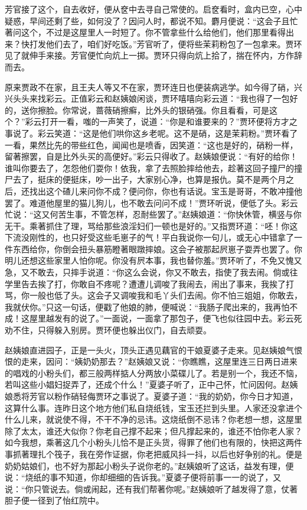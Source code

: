 \begin{parag}
    芳官接了这个，自去收好，便从奁中去寻自己常使的。启奁看时，盒内已空，心中疑惑，早间还剩了些，如何没了？因问人时，都说不知。麝月便说：“这会子且忙著问这个，不过是这屋里人一时短了。你不管拿些什么给他们，他们那里看得出来？快打发他们去了，咱们好吃饭。”芳官听了，便将些茉莉粉包了一包拿来。贾环见了就伸手来接。芳官便忙向炕上一掷。贾环只得向炕上拾了，揣在怀内，方作辞而去。
\end{parag}


\begin{parag}
    原来贾政不在家，且王夫人等又不在家，贾环连日也便装病逃学。如今得了硝，兴兴头头来找彩云。正值彩云和赵姨娘闲谈，贾环嘻嘻向彩云道：“我也得了一包好的，送你擦脸。你常说，蔷薇硝擦癣，比外头的银硝强。你且看看，可是这个？”彩云打开一看，嗤的一声笑了，说道：“你是和谁要来的？”贾环便将方才之事说了。彩云笑道：“这是他们哄你这乡老呢。这不是硝，这是茉莉粉。”贾环看了一看，果然比先的带些红色，闻闻也是喷香，因笑道：“这也是好的，硝粉一样，留著擦罢，自是比外头买的高便好。”彩云只得收了。赵姨娘便说：“有好的给你！谁叫你要去了，怎怨他们耍你！依我，拿了去照脸摔给他去，趁著这回子撞尸的撞尸去了，挺床的便挺床，吵一出子，大家别心净，也算是报仇。莫不是两个月之后，还找出这个碴儿来问你不成？便问你，你也有话说。宝玉是哥哥，不敢冲撞他罢了。难道他屋里的猫儿狗儿，也不敢去问问不成！”贾环听说，便低了头。彩云忙说：“这又何苦生事，不管怎样，忍耐些罢了。”赵姨娘道：“你快休管，横竖与你无干。乘著抓住了理，骂给那些浪淫妇们一顿也是好的。”又指贾环道：“呸！你这下流没刚性的，也只好受这些毛崽子的气！平白我说你一句儿，或无心中错拿了一件东西给你，你倒会扭头暴筋瞪著眼蹾摔娘。这会子被那起屄崽子耍弄也罢了。你明儿还想这些家里人怕你呢。你没有屄本事，我也替你羞。”贾环听了，不免又愧又急，又不敢去，只摔手说道：“你这么会说，你又不敢去，指使了我去闹。倘或往学里告去挨了打，你敢自不疼呢？遭遭儿调唆了我闹去，闹出了事来，我挨了打骂，你一般也低了头。这会子又调唆我和毛丫头们去闹。你不怕三姐姐，你敢去，我就伏你。”只这一句话，便戳了他娘的肺，便喊说：“我肠子爬出来的，我再怕不成！这屋里越发有的说了。”一面说，一面拿了那包子，便飞也似往园中去。彩云死劝不住，只得躲入别房。贾环便也躲出仪门，自去顽耍。
\end{parag}


\begin{parag}
    赵姨娘直进园子，正是一头火，顶头正遇见藕官的干娘夏婆子走来。见赵姨娘气恨恨的走来，因问：“姨奶奶那去？”赵姨娘又说：“你瞧瞧，这屋里连三日两日进来的唱戏的小粉头们，都三般两样掂人分两放小菜碟儿了。若是别一个，我还不恼，若叫这些小娼妇捉弄了，还成个什么！”夏婆子听了，正中己怀，忙问因何。赵姨娘悉将芳官以粉作硝轻侮贾环之事说了。夏婆子道：“我的奶奶，你今日才知道，这算什么事。连昨日这个地方他们私自烧纸钱，宝玉还拦到头里。人家还没拿进个什么儿来，就说使不得，不干不净的忌讳。这烧纸倒不忌讳？你老想一想，这屋里除了太太，谁还大似你？你老自己撑不起来；但凡撑起来的，谁还不怕你老人家？如今我想，乘著这几个小粉头儿恰不是正头货，得罪了他们也有限的，快把这两件事抓著理扎个筏子，我在旁作证据，你老把威风抖一抖，以后也好争别的礼。便是奶奶姑娘们，也不好为那起小粉头子说你老的。”赵姨娘听了这话，益发有理，便说：“烧纸的事不知道，你却细细的告诉我。”夏婆子便将前事一一的说了，又说：“你只管说去。倘或闹起，还有我们帮著你呢。”赵姨娘听了越发得了意，仗著胆子便一径到了怡红院中。
\end{parag}



